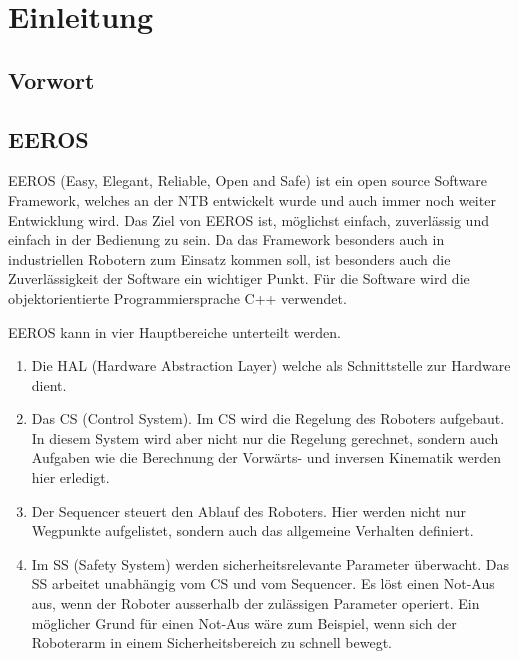 \chapter{Einleitung}


\section{Vorwort}



\section{EEROS}
EEROS (Easy, Elegant, Reliable, Open and Safe) ist ein open source Software Framework, welches an der NTB entwickelt wurde und auch immer noch weiter Entwicklung wird. 
Das Ziel von EEROS ist, möglichst einfach, zuverlässig und einfach in der Bedienung zu sein.
Da das Framework besonders auch in industriellen Robotern zum Einsatz kommen soll, ist besonders auch die Zuverlässigkeit der Software ein wichtiger Punkt.
Für die Software wird die objektorientierte Programmiersprache C++ verwendet. %


EEROS kann in vier Hauptbereiche unterteilt werden.
\begin{enumerate}
\item Die HAL (Hardware Abstraction Layer) welche als Schnittstelle zur Hardware dient.
\item Das CS (Control System). Im CS wird die Regelung des Roboters aufgebaut.
In diesem System wird aber nicht nur die Regelung gerechnet, sondern auch Aufgaben wie die Berechnung der Vorwärts- und inversen Kinematik werden hier erledigt.
\item Der Sequencer steuert den Ablauf des Roboters.
Hier werden nicht nur Wegpunkte aufgelistet, sondern auch das allgemeine Verhalten definiert. %
\item Im SS (Safety System) werden sicherheitsrelevante Parameter überwacht. Das SS arbeitet unabhängig vom CS und vom Sequencer. Es löst einen Not-Aus aus, wenn der Roboter ausserhalb der zulässigen Parameter operiert. Ein möglicher Grund für einen Not-Aus wäre zum Beispiel, wenn sich der Roboterarm in einem Sicherheitsbereich zu schnell bewegt.
\end{enumerate}






